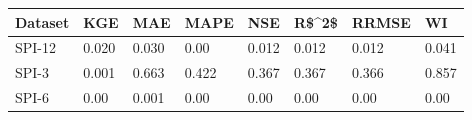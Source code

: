 \begin{tabular}{llllllll}
\toprule
Dataset &    KGE &    MAE &   MAPE &    NSE &  R\$\textasciicircum 2\$ &  RRMSE &     WI \\
\midrule
 SPI-12 &  0.020 &  0.030 &   0.00 &  0.012 &  0.012 &  0.012 &  0.041 \\
  SPI-3 &  0.001 &  0.663 &  0.422 &  0.367 &  0.367 &  0.366 &  0.857 \\
  SPI-6 &   0.00 &  0.001 &   0.00 &   0.00 &   0.00 &   0.00 &   0.00 \\
\bottomrule
\end{tabular}
